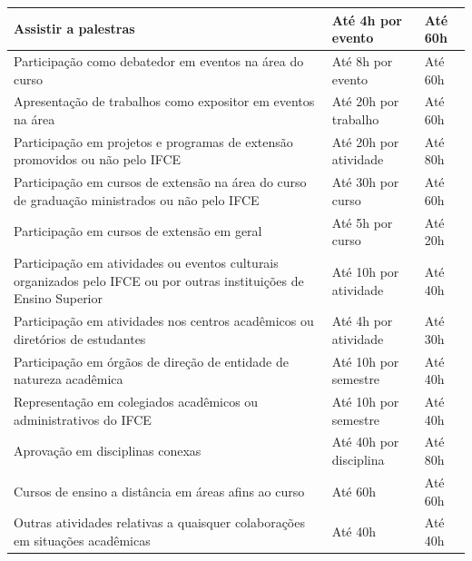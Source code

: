 \documentclass{paper}
\begin{document}
\begin{longtable}{|p{8.5cm}|p{3.5cm}|p{2cm}|}
 \hline
 
 Assistir a palestras & Até 4h por evento & Até 60h \\
 
 \hline
 
 Participação como debatedor em eventos na área do curso & Até 8h por evento & Até 60h \\
 
 \hline
 
 Apresentação de trabalhos como expositor em eventos na área & Até 20h por trabalho & Até 60h \\
 
 \hline
 
 Participação em projetos e programas de extensão promovidos ou não pelo IFCE & Até 20h por atividade & Até 80h \\
 
 \hline
 
 Participação em cursos de extensão na área do curso de graduação ministrados ou não pelo IFCE & Até 30h por curso & Até 60h \\
 
 \hline
 
 Participação em cursos de extensão em geral & Até 5h por curso & Até 20h \\
 
 \hline
 
 Participação em atividades ou eventos culturais organizados pelo IFCE ou por outras instituições de Ensino Superior & Até 10h por atividade & Até 40h \\
 
 \hline
 
 Participação em atividades nos centros acadêmicos ou diretórios de estudantes & Até 4h por atividade & Até 30h \\
 
 \hline
 
 Participação em órgãos de direção de entidade de natureza acadêmica & Até 10h por semestre & Até 40h \\
 
 \hline
 
 Representação em colegiados acadêmicos ou administrativos do IFCE & Até 10h por semestre & Até 40h \\
 
 \hline
 
 Aprovação em disciplinas conexas & Até 40h por disciplina & Até 80h \\
 
 \hline
 
 Cursos de ensino a distância em áreas afins ao curso & Até 60h & Até 60h \\
 
 \hline
 
 Outras atividades relativas a quaisquer colaborações em situações acadêmicas & Até 40h & Até 40h \\

 \hline
 
 \end{longtable} 
\end{document}
